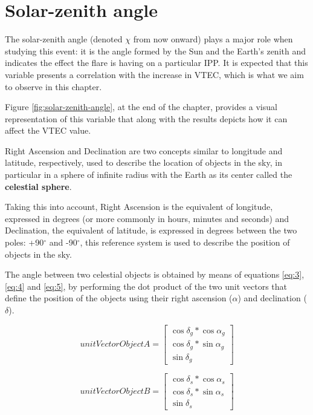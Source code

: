 \section{Solar-zenith angle}

The solar-zenith angle (denoted $\chi$ from now onward) plays a major role when studying this event: it is the angle formed by the Sun and the Earth's zenith and indicates the effect the flare is having on a particular IPP. It is expected that this variable presents a correlation with the increase in VTEC, which is what we aim to observe in this chapter.

Figure \ref{fig:solar-zenith-angle}, at the end of the chapter, provides a visual representation of this variable that along with the results depicts how it can affect the VTEC value. 

Right Ascension and Declination are two concepts similar to longitude and latitude, respectively, used to describe the location of objects in the sky, in particular in a sphere of infinite radius with the Earth as its center called the \textbf{celestial sphere}.

Taking this into account, Right Ascension is the equivalent of longitude, expressed in degrees (or more commonly in hours, minutes and seconds) and Declination, the equivalent of latitude, is expressed in degrees between the two poles: +90$^{\circ}$ and -90$^{\circ}$, this reference system is used to describe the position of objects in the sky. \cite{nasareferencesystem}

The angle between two celestial objects is obtained by means of equations \ref{eq:3}, \ref{eq:4} and \ref{eq:5}, by performing the dot product of the two unit vectors that define the position of the objects using their right ascension ($\alpha$) and declination ($\delta$).

\begin{equation} \label{eq:3}
unitVectorObjectA =	
\begin{bmatrix}
\cos\delta_{g} * \cos\alpha_{g} \\ 
\cos\delta_{g} * \sin\alpha_{g} \\
\sin\delta_{g}
\end{bmatrix}
\end{equation}

\begin{equation} \label{eq:4}
unitVectorObjectB =	
\begin{bmatrix}
\cos\delta_{s} * \cos\alpha_{s} \\ 
\cos\delta_{s} * \sin\alpha_{s} \\
\sin\delta_{s}
\end{bmatrix}
\end{equation}

